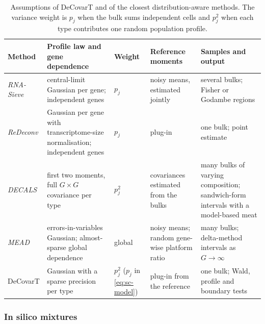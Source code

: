 \documentclass[pdflatex, sn-nature]{sn-jnl}
\theoremstyle{thmstyleone}%
\theoremstyle{thmstyletwo}%
\theoremstyle{thmstylethree}%
\begin{document}
\begin{table}[ht]
  \centering
  \small
  \caption{Assumptions of DeCovarT and of the closest distribution-aware methods. The variance
    weight is \(p_{j}\) when the bulk sums independent cells and \(p_{j}^{2}\) when each type
    contributes one random population profile.}
  \label{tab:assumptions}
  \begin{tabular}{@{}>{\raggedright\arraybackslash}p{}>{\raggedright\arraybackslash}p{}>{\raggedright\arraybackslash}p{}>{\raggedright\arraybackslash}p{}>{\raggedright\arraybackslash}p{}@{}}
    \toprule
    Method & Profile law and gene dependence & Weight & Reference moments & Samples and output \\
    \midrule
    \emph{RNA-Sieve} \cite{erdmann-phamLikelihoodbasedDeconvolutionBulk2021} &
      central-limit Gaussian per gene; independent genes & \(p_{j}\) &
      noisy means, estimated jointly & several bulks; Fisher or Godambe regions \\
    \emph{ReDeconv} \cite{luTranscriptomeSizeMatters2025} &
      Gaussian per gene with transcriptome-size normalisation; independent genes & \(p_{j}\) &
      plug-in & one bulk; point estimate \\
    \emph{DECALS} \cite{caiStatisticalInferenceCelltype2024} &
      first two moments, full \(G\times G\) covariance per type & \(p_{j}^{2}\) &
      covariances estimated from the bulks & many bulks of varying composition; sandwich-form intervals with a
      model-based meat \\
    \emph{MEAD} \cite{xieStatisticalInferenceCell2026} &
      errors-in-variables Gaussian; almost-sparse global dependence & global &
      noisy means; random gene-wise platform ratio & many bulks; delta-method intervals as \(G\to\infty\) \\
    DeCovarT &
      Gaussian with a sparse precision per type & \(p_{j}^{2}\) (\(p_{j}\) in \eqref{eq:sc-model}) &
      plug-in from the reference & one bulk; Wald, profile and boundary tests \\
    \bottomrule
  \end{tabular}
\end{table}

\subsubsection{In silico mixtures}
\label{sec:synthetic}
\end{document}
